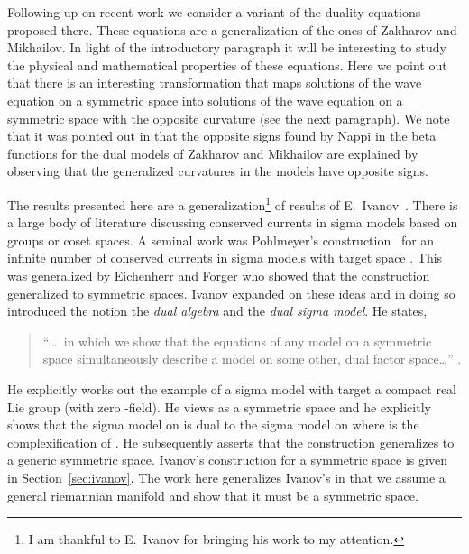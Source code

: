 \documentclass[a4paper,12pt]{article}
\begin{document}
Following up on recent work \cite{Alvarez:2000bh} we consider a
variant of the duality equations proposed there.  These equations are
a generalization of the ones of Zakharov and Mikhailov.  In light of
the introductory paragraph it will be interesting to study the
physical and mathematical properties of these equations.  Here we
point out that there is an interesting transformation that maps
solutions of the wave equation on a symmetric space into solutions of
the wave equation on a symmetric space with the opposite curvature 
(see the next paragraph). 
We note that it was pointed out in \cite{Zachos:1994fa} that the
opposite signs found by Nappi in the beta functions for the dual
models of Zakharov and Mikhailov are explained by observing that the
generalized curvatures in the models have opposite signs.

The results presented here are a generalization\footnote{I am thankful
to E.~Ivanov for bringing his work to my attention.} of results of
E.~Ivanov~\cite{Ivanov:1987yv}.  There is a large body of literature
discussing conserved currents in sigma models based on groups or coset
spaces.  A seminal work was Pohlmeyer's
construction~\cite{Pohlmeyer:1975nb} for an infinite number of
conserved currents in sigma models with target space \coordHE{}.  This
was generalized by Eichenherr and Forger
\cite{Eichenherr:1979ci,Eichenherr:1981sk} who showed that the
construction generalized to symmetric spaces.  Ivanov expanded on
these ideas and in doing so introduced the notion the \emph{dual
algebra} and the \emph{dual sigma model}.  He states, 
\begin{quote}
    ``\ldots\ in
    which we show that the equations of any \coordHE{}  \myHighlight{$\sigma$}\coordHE{} model on a
    symmetric space simultaneously describe a \coordHE{}  \myHighlight{$\sigma$}\coordHE{} model on some
    other, dual factor space\ldots'' \cite[p.  475]{Ivanov:1987yv}.
\end{quote}
He explicitly works out the example of a sigma model with target a
compact real Lie group \coordHE{} (with zero \coordHE{}-field).  He views \coordHE{} as a
symmetric space \coordHE{} and he explicitly shows that the sigma
model on \coordHE{} is dual to the sigma model on \coordHE{} where
\coordHE{} is the complexification of \coordHE{}.  He subsequently
asserts that the construction generalizes to a generic symmetric 
space. Ivanov's construction for a symmetric space is given in 
Section~\ref{sec:ivanov}.  The work here generalizes Ivanov's in that
we assume a general riemannian manifold and show that it must be a
symmetric space.
\end{document}

